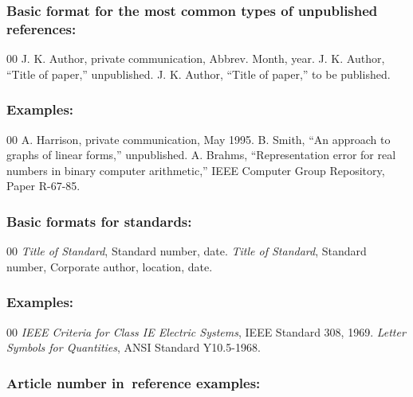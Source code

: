 \subsubsection*{Basic format for the most common types of unpublished references:}

\begin{thebibliography}{00}
 J. K. Author, private communication, Abbrev. Month, year.
 J. K. Author, ``Title of paper,'' unpublished.
 J. K. Author, ``Title of paper,'' to be published.
\end{thebibliography}

\subsubsection*{Examples:}

\begin{thebibliography}{00}
 A. Harrison, private communication, May 1995.
 B. Smith, ``An approach to graphs of linear forms,'' unpublished.
 A. Brahms, ``Representation error for real numbers in binary computer arithmetic,'' IEEE Computer Group Repository, Paper R-67-85.
\end{thebibliography}

\subsubsection*{Basic formats for standards:}

\begin{thebibliography}{00}
 \textit{Title of Standard}, Standard number, date.
 \textit{Title of Standard}, Standard number, Corporate author, location, date.
\end{thebibliography}

\subsubsection*{Examples:}

\begin{thebibliography}{00}
 \emph{IEEE Criteria for Class IE Electric Systems}, IEEE Standard 308, 1969.
 \emph{Letter Symbols for Quantities}, ANSI Standard Y10.5-1968.
\end{thebibliography}

\subsubsection*{Article number in~reference examples:}


